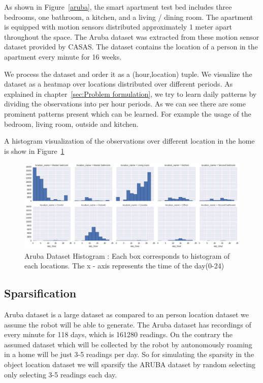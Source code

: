As shown in Figure~\ref{aruba}, the smart apartment test bed includes three bedrooms, one bathroom, a kitchen, and a living / dining room.  The apartment is equipped with motion sensors distributed approximately 1 meter apart throughout the space. The Aruba dataset was extracted from these motion sensor dataset provided by CASAS. The dataset contains the location of a person in the apartment every minute for 16 weeks.

We process the dataset and  order it as a (hour,location) tuple. We visualize the dataset as a heatmap over locations distributed over different periods. As explained in chapter~\ref{sec:Problem formulation}, we try to learn daily patterns by dividing the observations into per hour periods. As we can see there are some prominent patterns present which can be learned. For example the usage of the bedroom, living room, outside and kitchen.

A histogram visualization of the observations over different location in the home is show in Figure~\ref{aruba-hist}

\begin{figure}[htp]
\centering
\includegraphics[width=\textwidth]{images/aruba-hist.png}
\caption[Aruba dataset histogram]{Aruba Dataset Histogram : Each box corresponds to histogram of each locations. The x - axis represents the time of the day(0-24) }
\label{aruba-hist}
\end{figure}


\subsection*{Sparsification}
Aruba dataset is a large dataset as compared to an person location dataset we assume the robot will be able to generate. The Aruba dataset has recordings of every minute for 118 days, which is 161280 readings.
On the contrary the assumed dataset which will be collected by the robot by autonomously roaming in a home will be just 3-5 readings per day.
So for simulating the sparsity in the object location dataset we will sparsify the ARUBA dataset by random selecting only selecting 3-5 readings each day.

